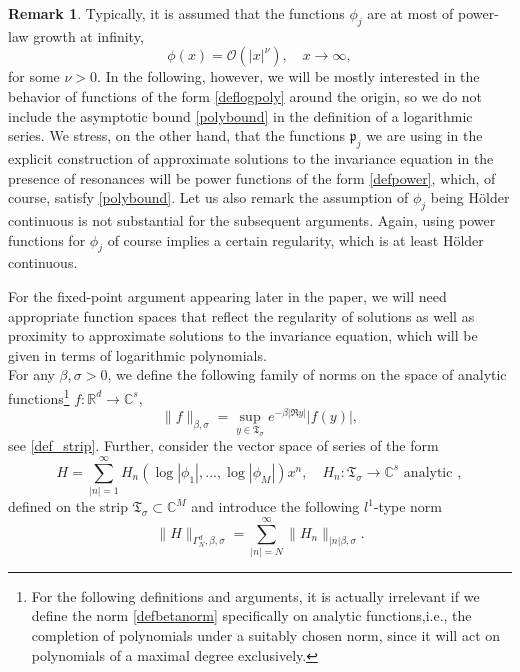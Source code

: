 \documentclass{amsart}
\theoremstyle{plain}
\theoremstyle{definition}
\newtheorem{remark}[theorem]{Remark}
\begin{document}
\begin{remark}
    Typically, it is assumed that the functions $\phi_j$ are at most of power-law growth at infinity,
\begin{equation}\label{polybound}
    \phi(x) = \mathcal{O}(|x|^\nu),\quad x\to\infty,
\end{equation}
for some $\nu>0$. In the following, however, we will be mostly interested in the behavior of functions of the form \eqref{deflogpoly} around the origin, so we do not include the asymptotic bound \eqref{polybound} in the definition of a logarithmic series. We stress, on the other hand, that the functions $\mathfrak{p}_j$ we are using in the explicit construction of approximate solutions to the invariance equation in the presence of resonances will be power functions of the form  \eqref{defpower}, which, of course, satisfy \eqref{polybound}. Let us also remark the assumption of $\phi_j$ being H\"{o}lder continuous is not substantial for the subsequent arguments. Again, using power functions for $\phi_j$ of course implies a certain regularity, which is at least H\"{o}lder continuous.  
 \end{remark}


For the fixed-point argument appearing later in the paper, we will need appropriate function spaces that reflect the regularity of solutions as well as proximity to approximate solutions to the invariance equation, which will be given in terms of logarithmic polynomials.\\
For any $\beta,\sigma >0$, we define the following family of norms on the space of analytic functions\footnote{For the following definitions and arguments, it is actually irrelevant if we define the norm \eqref{defbetanorm} specifically on analytic functions,i.e., the completion of polynomials under a suitably chosen norm, since it will act on polynomials of a maximal degree exclusively.} $f:\mathbb{R}^d\to \mathbb{C}^s$, 
\begin{equation}\label{defbetanorm}
\|f\|_{\beta,\sigma} = \sup_{y\in \mathfrak{T}_\sigma} e^{-\beta |\Re y|}|f(y)|,
\end{equation}
see \eqref{def_strip}. Further, consider the vector space of series of the form 
\begin{equation}\label{def_H}
H = \sum_{|n|=1}^\infty H_n(\log|\phi_1|,...,\log|\phi_M|)x^n,\quad H_n:\mathfrak{T}_\sigma\to\mathbb{C}^s \text{ analytic },
\end{equation}
defined on the strip $\mathfrak{T}_\sigma\subset \mathbb{C}^M$ and introduce the following $l^1$-type norm
\begin{equation}\label{defnorm}
    \|H\|_{\Gamma_N^d,\beta,\sigma} = \sum_{|n| = N}^{\infty} \|H_n\|_{|n|\beta,\sigma}. 
\end{equation}
\end{document}
